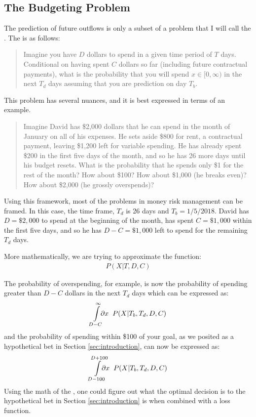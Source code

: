 \documentclass[11pt,a4paper]{article}
\begin{document}
\subsection{The Budgeting Problem}
The prediction of future outflows is only a subset of a problem that I will call the \budgetprob. The \budgetprob is as follows:
\begin{quote}
	Imagine you have $D$ dollars to spend in a given time period of $T$ days. Conditional on having spent $C$ dollars so far (including future contractual payments), what is the probability that you will spend $x \in [0,\infty)$ in the next $T_d$ days assuming that you are prediction on day $T_b$.  
\end{quote}
This problem has several nuances, and it is best expressed in terms of an example. 
\begin{quote}
	Imagine David has \$2,000 dollars that he can spend in the month of January on all of his expenses. He sets aside \$800 for rent, a contractual payment, leaving \$1,200 left for variable spending. He has already spent \$200 in the first five days of the month, and so he has 26 more days until his budget resets. What is the probability that he spends only \$1 for the rest of the month? How about \$100? How about \$1,000 (he breaks even)? How about \$2,000 (he grossly overspends)?
\end{quote}

Using this framework, most of the problems in money risk management can be framed. In this case, the time frame, $T_d$ is 26 days and $T_b = 1/5/2018$. David has $D = \$2,000$ to spend at the beginning of the month, has spent $C = \$1,000$ within the first five days, and so he has $D - C = \$1,000$ left to spend for the remaining $T_d$ days. 

More mathematically, we are trying to approximate the function:
\begin{align*}
P(X | T, D, C)
\end{align*} 

\newcommand{\custompartial}{\ensuremath{\hspace{-3mm}\partial x \hspace{2mm}}}
The probability of overspending, for example, is now the probability of spending greater than $D - C$ dollars in the next $T_d$ days which can be expressed as:
\begin{align*}
\int\limits_{D-C}^{\infty} \hspace{1mm} \custompartial P(X | T_b, T_d, D, C) 
\end{align*}
and the probability of spending within \$100 of your goal, as we posited as a hypothetical bet in Section \ref{sec:introduction}, can now be expressed as: 
\begin{align*}
\int\limits_{D - 100}^{D + 100} \custompartial P(X | T_b, T_d, D, C) 
\end{align*}
Using the math of the \budgetprob, one could figure out what the optimal decision is to the hypothetical bet in Section \ref{sec:introduction} is when combined with a loss function. 
\end{document}
